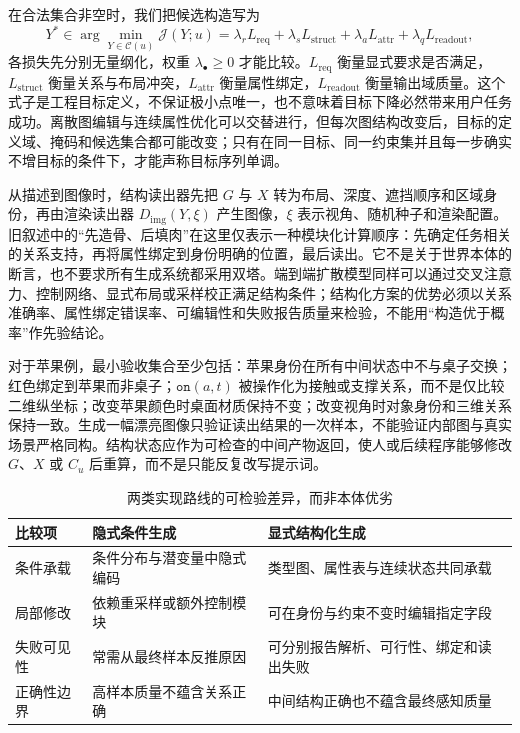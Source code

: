 在合法集合非空时，我们把候选构造写为
\begin{equation}
  Y^*\in\arg\min_{Y\in\mathcal C(u)}
  \mathcal J(Y;u)=\lambda_r L_{\mathrm{req}}+\lambda_s L_{\mathrm{struct}}
  +\lambda_a L_{\mathrm{attr}}+\lambda_q L_{\mathrm{readout}},
\end{equation}
各损失先分别无量纲化，权重 $\lambda_\bullet\ge0$ 才能比较。$L_{\mathrm{req}}$ 衡量显式要求是否满足，$L_{\mathrm{struct}}$ 衡量关系与布局冲突，$L_{\mathrm{attr}}$ 衡量属性绑定，$L_{\mathrm{readout}}$ 衡量输出域质量。这个式子是工程目标定义，不保证极小点唯一，也不意味着目标下降必然带来用户任务成功。离散图编辑与连续属性优化可以交替进行，但每次图结构改变后，目标的定义域、掩码和候选集合都可能改变；只有在同一目标、同一约束集并且每一步确实不增目标的条件下，才能声称目标序列单调。

从描述到图像时，结构读出器先把 $G$ 与 $X$ 转为布局、深度、遮挡顺序和区域身份，再由渲染读出器 $D_{\mathrm{img}}(Y,\xi)$ 产生图像，$\xi$ 表示视角、随机种子和渲染配置。旧叙述中的“先造骨、后填肉”在这里仅表示一种模块化计算顺序：先确定任务相关的关系支持，再将属性绑定到身份明确的位置，最后读出。它不是关于世界本体的断言，也不要求所有生成系统都采用双塔。端到端扩散模型同样可以通过交叉注意力、控制网络、显式布局或采样校正满足结构条件；结构化方案的优势必须以关系准确率、属性绑定错误率、可编辑性和失败报告质量来检验，不能用“构造优于概率”作先验结论。

对于苹果例，最小验收集合至少包括：苹果身份在所有中间状态中不与桌子交换；红色绑定到苹果而非桌子；$\texttt{on}(a,t)$ 被操作化为接触或支撑关系，而不是仅比较二维纵坐标；改变苹果颜色时桌面材质保持不变；改变视角时对象身份和三维关系保持一致。生成一幅漂亮图像只验证读出结果的一次样本，不能验证内部图与真实场景严格同构。结构状态应作为可检查的中间产物返回，使人或后续程序能够修改 $G$、$X$ 或 $C_u$ 后重算，而不是只能反复改写提示词。

\begin{table}[htbp]
  \centering
  \caption{两类实现路线的可检验差异，而非本体优劣}
  \label{tab:sd-vs-msc}
  \begin{tabular}{@{}p{}p{}p{}@{}}
    \toprule
    \textbf{比较项} & \textbf{隐式条件生成} & \textbf{显式结构化生成} \\
    \midrule
    条件承载 & 条件分布与潜变量中隐式编码 & 类型图、属性表与连续状态共同承载 \\
    局部修改 & 依赖重采样或额外控制模块 & 可在身份与约束不变时编辑指定字段 \\
    失败可见性 & 常需从最终样本反推原因 & 可分别报告解析、可行性、绑定和读出失败 \\
    正确性边界 & 高样本质量不蕴含关系正确 & 中间结构正确也不蕴含最终感知质量 \\
    \bottomrule
  \end{tabular}
\end{table}

